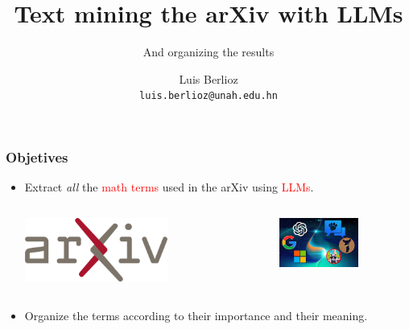 \documentclass[10pt, handout]{beamer}
\title{Text mining the arXiv with LLMs}
\subtitle{And organizing the results}
\author{Luis Berlioz\\
\texttt{luis.berlioz@unah.edu.hn}}
\institute{Universidad Nacional Autónoma de Honduras}
\newcommand{\arxiv}{arXiv}
\begin{document}
\begin{frame}
\titlepage
\end{frame}


\begin{frame}
    \frametitle{Objetives}
    \begin{itemize}
        \item Extract \emph{all} the \textcolor<2>{red}{math terms}  used in the \arxiv{} using \textcolor<3>{red}{LLMs}.
            \begin{columns}
                \begin{column}{0.5\textwidth}
            \begin{center}
                \includegraphics[width=0.6\textwidth]{../Images/ArXiv_logo_2022.svg.png}
            \end{center}
        \end{column}
        \begin{column}{0.5\textwidth}
            \begin{center}
                \includegraphics[width=0.6\textwidth]{../Images/all_llm_logos.jpeg}
            \end{center}

        \end{column}
    \end{columns}
        \item Organize the terms   according to their importance and their meaning.   
    \end{itemize}
\end{frame}
\end{document}
